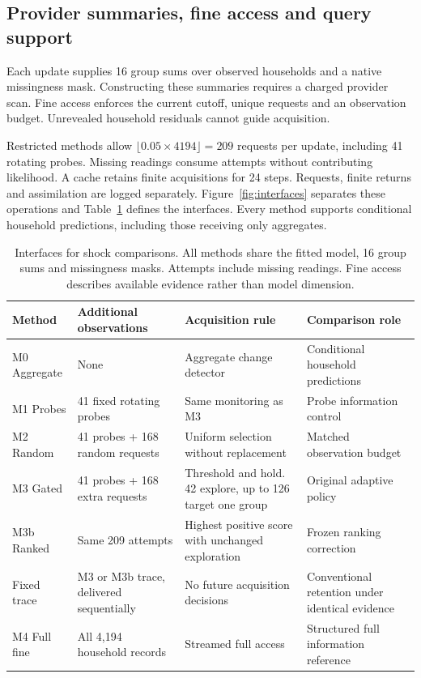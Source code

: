 \documentclass[conference]{IEEEtran}
\begin{document}
\subsection{Provider summaries, fine access and query support}
Each update supplies 16 group sums over observed households and a native missingness mask. Constructing these summaries requires a charged provider scan. Fine access enforces the current cutoff, unique requests and an observation budget. Unrevealed household residuals cannot guide acquisition.

Restricted methods allow $\lfloor0.05\times4194\rfloor=209$ requests per update, including 41 rotating probes. Missing readings consume attempts without contributing likelihood. A cache retains finite acquisitions for 24 steps. Requests, finite returns and assimilation are logged separately. Figure~\ref{fig:interfaces} separates these operations and Table~\ref{tab:methods} defines the interfaces. Every method supports conditional household predictions, including those receiving only aggregates.

\begin{table}[!t]
\caption{Interfaces for shock comparisons. All methods share the fitted model, 16 group sums and missingness masks. Attempts include missing readings. Fine access describes available evidence rather than model dimension.}
\label{tab:methods}\centering
\begin{tabular}{p{}p{}p{}p{}}
\toprule
Method & Additional observations & Acquisition rule & Comparison role\\
\midrule
M0 Aggregate & None & Aggregate change detector & Conditional household predictions\\
M1 Probes & 41 fixed rotating probes & Same monitoring as M3 & Probe information control\\
M2 Random & 41 probes + 168 random requests & Uniform selection without replacement & Matched observation budget\\
M3 Gated & 41 probes + 168 extra requests & Threshold and hold. 42 explore, up to 126 target one group & Original adaptive policy\\
M3b Ranked & Same 209 attempts & Highest positive score with unchanged exploration & Frozen ranking correction\\
Fixed trace & M3 or M3b trace, delivered sequentially & No future acquisition decisions & Conventional retention under identical evidence\\
M4 Full fine & All 4,194 household records & Streamed full access & Structured full information reference\\
\bottomrule
\end{tabular}
\end{table}
\end{document}
